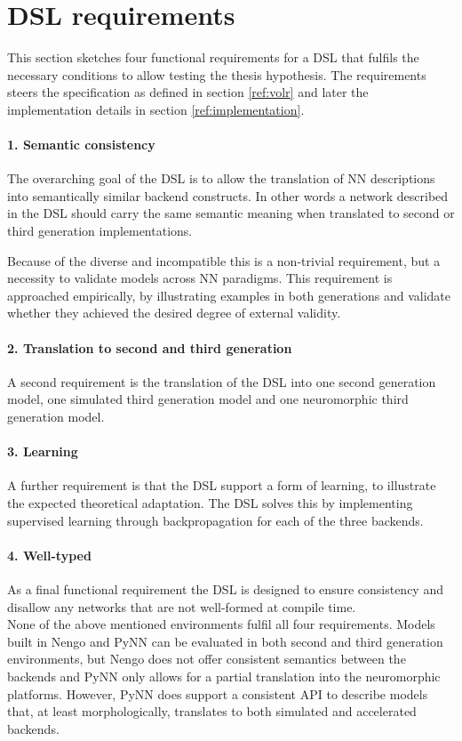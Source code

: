 \documentclass[report.tex]{subfiles}
\begin{document}
\section{DSL requirements} \label{sec:requirements}
This section sketches four functional requirements for a \gls{DSL} that 
fulfils the necessary conditions to allow testing the thesis hypothesis.
The requirements steers the specification as defined in section 
\ref{ref:volr} and later the implementation details in section
\ref{ref:implementation}.

\paragraph{1. Semantic consistency}
The overarching goal of the \gls{DSL} is to allow the translation 
of \gls{NN} descriptions into semantically similar backend constructs.
In other words a network described in the \gls{DSL} should carry
the same semantic meaning when translated to second or third generation
implementations. 

Because of the diverse and incompatible this is a non-trivial requirement,
but a necessity to validate models across \gls{NN} paradigms.
This requirement is approached empirically, by illustrating examples in
both generations and validate whether they achieved the desired degree
of external validity.

\paragraph{2. Translation to second and third generation}
A second requirement is the translation of the \gls{DSL} into
one second generation model, one simulated third generation model
and one neuromorphic third generation model.

\paragraph{3. Learning}
A further requirement is that the \gls{DSL} support a form of
learning, to illustrate the expected theoretical adaptation.
The \gls{DSL} solves this by implementing supervised 
learning through backpropagation  for each
of the three backends.

\paragraph{4. Well-typed}
As a final functional requirement the \gls{DSL} is designed to ensure
consistency and disallow any networks that are not well-formed at
compile time.
\\[0.4cm]
\noindent
None of the above mentioned environments fulfil all four requirements.
Models built in Nengo and PyNN can be evaluated
in both second and third generation environments, but Nengo does not 
offer consistent semantics between the backends and PyNN only allows
for a partial translation into the neuromorphic platforms.
However, PyNN does support a consistent \gls{API} to describe models that, at
least morphologically, translates to both simulated and accelerated 
backends.
\end{document}
